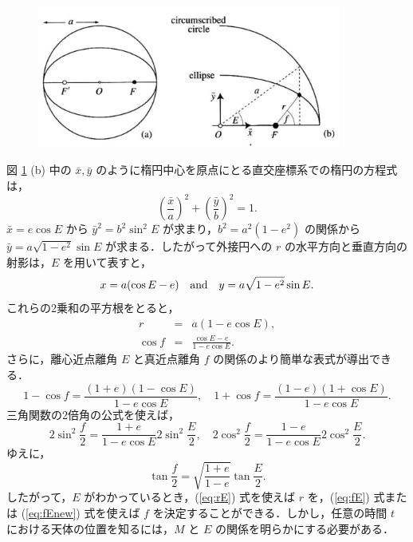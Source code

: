 \documentclass[11pt,a4paper,oneside,onecolumn]{jreport}
\begin{document}
\begin{figure}[H]
\centering
\includegraphics[width=10cm]{./image/sec2_7.pdf}
\caption{\label{fig:Ef}}
\end{figure}

図 \ref{fig:Ef} (b) 中の $\bar{x}, \bar{y}$ のように楕円中心を原点にとる直交座標系での楕円の方程式は，
\begin{equation}
\left( \frac{\bar{x}}{a} \right)^2 + \left( \frac{\bar{y}}{b} \right)^2 = 1.
\end{equation}
$\bar{x} = e \cos E$ から $\bar{y}^2 = b^2 \sin^2 E$ が求まり，$b^2 = a^2 (1 - e^2)$ の関係から $\bar{y} = a \sqrt{1 - e^2} \sin E$ が求まる．したがって外接円への $r$ の水平方向と垂直方向の射影は，$E$ を用いて表すと，
\begin{equation}
x = a (\cos E - e) \quad {\rm and} \quad y = a \sqrt{1 - e^2} \sin E. \label{eq:xEyE}
\end{equation}
これらの2乗和の平方根をとると，
\begin{eqnarray}
r & = & a (1 - e \cos E), \label{eq:rE} \\
\cos f & = & \frac{\cos E - e}{1 - e \cos E}. \label{eq:fE}
\end{eqnarray}
さらに，離心近点離角 $E$ と真近点離角 $f$ の関係のより簡単な表式が導出できる．
\begin{equation}
1 - \cos f = \frac{(1 + e) (1 - \cos E)}{1 - e \cos E}, \quad 1 + \cos f = \frac{(1 - e) (1 + \cos E)}{1 - e \cos E}.
\end{equation}
三角関数の2倍角の公式を使えば，
\begin{equation}
2 \sin^2 \frac{f}{2} = \frac{1 + e}{1 - e \cos E} 2 \sin^2 \frac{E}{2}, \quad 2 \cos^2 \frac{f}{2} = \frac{1 - e}{1 - e \cos E} 2 \cos^2 \frac{E}{2}.
\end{equation}
ゆえに，
\begin{equation}
\tan \frac{f}{2} = \sqrt{\frac{1 + e}{1 - e}} \tan \frac{E}{2}. \label{eq:fEnew}
\end{equation}
したがって，$E$ がわかっているとき，(\ref{eq:rE}) 式を使えば $r$ を，(\ref{eq:fE}) 式または (\ref{eq:fEnew}) 式を使えば $f$ を決定することができる．しかし，任意の時間 $t$ における天体の位置を知るには，$M$ と $E$ の関係を明らかにする必要がある．
\end{document}
